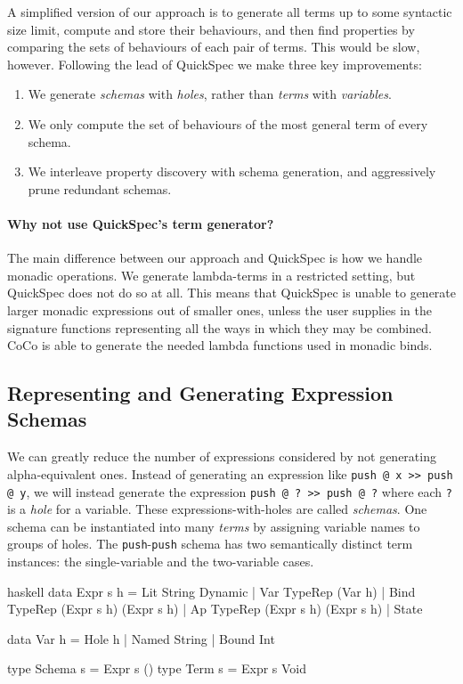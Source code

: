 A simplified version of our approach is to generate all terms up to
some syntactic size limit, compute and store their behaviours, and
then find properties by comparing the sets of behaviours of each pair
of terms.  This would be slow, however.  Following the lead of
QuickSpec \parencite{claessen2010,smallbone2017} we make three key
improvements:

\begin{enumerate}
\item We generate \emph{schemas} with \emph{holes}, rather than
  \emph{terms} with \emph{variables}.
\item We only compute the set of behaviours of the most general term
  of every schema.
\item We interleave property discovery with schema generation, and
  aggressively prune redundant schemas.
\end{enumerate}

\paragraph{Why not use QuickSpec's term generator?}
The main difference between our approach and QuickSpec is how we
handle monadic operations.  We generate lambda-terms in a restricted
setting, but QuickSpec does not do so at all.  This means that
QuickSpec is unable to generate larger monadic expressions out of
smaller ones, unless the user supplies in the signature functions
representing all the ways in which they may be combined.  CoCo is able
to generate the needed lambda functions used in monadic binds.

\subsection{Representing and Generating Expression Schemas}
\label{sec:coco-hiw-gen}

We can greatly reduce the number of expressions considered by not
generating alpha-equivalent ones.  Instead of generating an expression
like \verb|push @ x >> push @ y|, we will instead generate the
expression \verb|push @ ? >> push @ ?| where each \verb|?| is a
\emph{hole} for a variable.  These expressions-with-holes are called
\emph{schemas}.  One schema can be instantiated into many \emph{terms}
by assigning variable names to groups of holes.  The
\verb|push|-\verb|push| schema has two semantically distinct term
instances: the single-variable and the two-variable cases.

\begin{listing}
\centering
\begin{cminted}{haskell}
data Expr s h
  = Lit  String Dynamic
  | Var  TypeRep (Var h)
  | Bind TypeRep (Expr s h) (Expr s h)
  | Ap   TypeRep (Expr s h) (Expr s h)
  | State

data Var h = Hole h | Named String | Bound Int

type Schema s = Expr s ()
type Term   s = Expr s Void
\end{cminted}
\caption{Representation of Haskell expressions.}
\label{lst:exprrep}
\end{listing}

